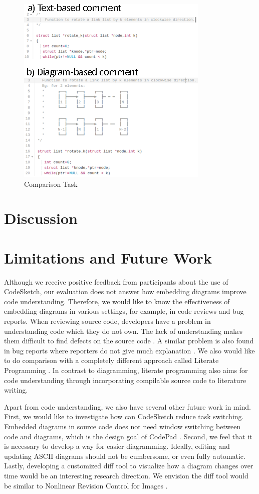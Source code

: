 \documentclass{sig-alternate}
\begin{document}
\begin{figure}[H]
\centering
\includegraphics[scale=1.5]{comparison_task.eps}
\caption{Comparison Task}
\label{fig:comparison_task}
\end{figure}

\label{results}

\section{Discussion}

\section{Limitations and Future Work}

Although we receive positive feedback from participants about the use of CodeSketch, our evaluation does not answer how embedding diagrams improve code understanding. Therefore, we would like to know the effectiveness of embedding diagrams in various settings, for example, in code reviews and bug reports. When reviewing source code, developers have a problem in understanding code which they do not own. The lack of understanding makes them difficult to find defects on the source code \cite{Bacchelli2013}. A similar problem is also found in bug reports where reporters do not give much explanation \cite{Bettenburg2008}. We also would like to do comparison with a completely different approach  called Literate Programming \cite{Knuth1984}. In contrast to diagramming, literate programming also aims for code understanding through  incorporating compilable source code to literature writing.

Apart from code understanding, we also have several other future work in mind. First, we would like to investigate how can CodeSketch reduce task switching. Embedded diagrams in source code does not need window switching between code and diagrams, which is the design goal of CodePad \cite{Parnin2010}. Second, we feel that it is necessary to develop a way for easier diagramming. Ideally, editing and updating ASCII diagrams should not be cumbersome, or even fully automatic. Lastly, developing a customized diff tool to visualize how a diagram changes over time would be an interesting research direction. We envision the diff tool would be similar to Nonlinear Revision Control for Images \cite{Chen2011}. 
\end{document}
